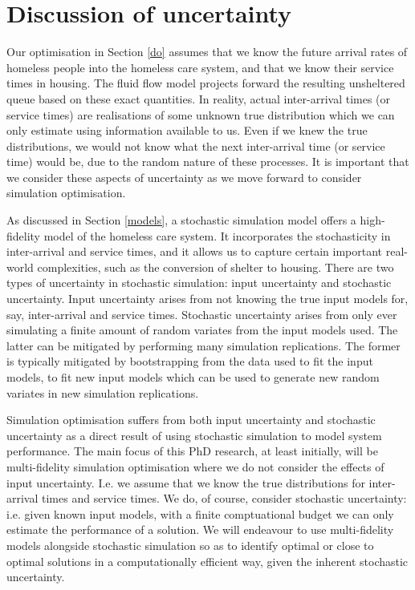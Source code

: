 \documentclass[12pt,a4paper]{article}
\begin{document}
\newpage

\section{Discussion of uncertainty} \label{uncert}

Our optimisation in Section \ref{do} assumes that we know the future arrival rates of homeless people into the homeless care system, and that we know their service times in housing. The fluid flow model projects forward the resulting unsheltered queue based on these exact quantities. In reality, actual inter-arrival times (or service times) are realisations of some unknown true distribution which we can only estimate using information available to us. Even if we knew the true distributions, we would not know what the next inter-arrival time (or service time) would be, due to the random nature of these processes. It is important that we consider these aspects of uncertainty as we move forward to consider simulation optimisation.

As discussed in Section \ref{models}, a stochastic simulation model offers a high-fidelity model of the homeless care system. It incorporates the stochasticity in inter-arrival and service times, and it allows us to capture certain important real-world complexities, such as the conversion of shelter to housing. There are two types of uncertainty in stochastic simulation: input uncertainty and stochastic uncertainty. Input uncertainty arises from not knowing the true input models for, say, inter-arrival and service times. Stochastic uncertainty arises from only ever simulating a finite amount of random variates from the input models used. The latter can be mitigated by performing many simulation replications. The former is typically mitigated by bootstrapping from the data used to fit the input models, to fit new input models which can be used to generate new random variates in new simulation replications.

Simulation optimisation suffers from both input uncertainty and stochastic uncertainty as a direct result of using stochastic simulation to model system performance. The main focus of this PhD research, at least initially, will be multi-fidelity simulation optimisation where we do not consider the effects of input uncertainty. I.e. we assume that we know the true distributions for inter-arrival times and service times. We do, of course, consider stochastic uncertainty: i.e. given known input models, with a finite comptuational budget we can only estimate the performance of a solution. We will endeavour to use multi-fidelity models alongside stochastic simulation so as to identify optimal or close to optimal solutions in a computationally efficient way, given the inherent stochastic uncertainty.
\end{document}
